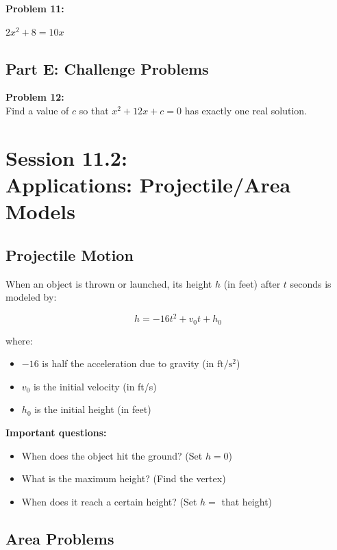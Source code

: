\documentclass[12pt]{article}
\begin{document}
			\vspace{6cm}

			\textbf{Problem 11:}
            
            $2x^2 + 8 = 10x$

			\newpage

		\subsection*{Part E: Challenge Problems}


			\textbf{Problem 12:}\\

			Find a value of $c$ so that $x^2 + 12x + c = 0$ has exactly one real solution.

			\newpage

	\section*{Session 11.2: \\ Applications: Projectile/Area Models}

		\subsection*{Projectile Motion}

			When an object is thrown or launched, its height $h$ (in feet) after $t$ seconds is modeled by:

			$$h = -16t^2 + v_0 t + h_0$$

			where:
			\begin{itemize}
				\item $-16$ is half the acceleration due to gravity (in $\text{ft}/\text{s}^2$)
				\item $v_0$ is the initial velocity (in ft/s)
				\item $h_0$ is the initial height (in feet)
			\end{itemize}

			\textbf{Important questions:}
			\begin{itemize}
				\item When does the object hit the ground? (Set $h = 0$)
				\item What is the maximum height? (Find the vertex)
				\item When does it reach a certain height? (Set $h =$ that height)
			\end{itemize}

		\subsection*{Area Problems}
\end{document}
